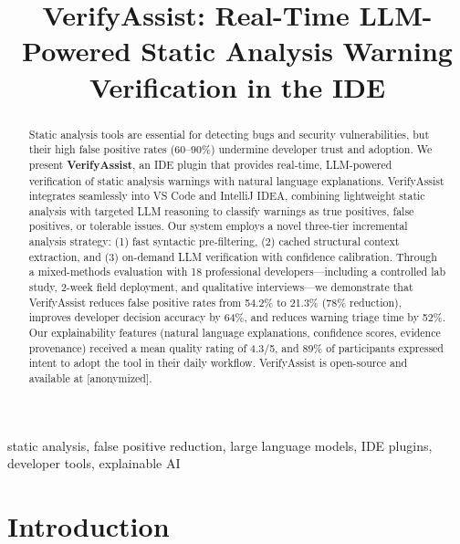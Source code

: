 \documentclass[conference]{IEEEtran}
\begin{document}
\title{VerifyAssist: Real-Time LLM-Powered Static Analysis Warning Verification in the IDE}

\author{
}

\maketitle

\begin{abstract}
Static analysis tools are essential for detecting bugs and security vulnerabilities, but their high false positive rates (60--90\%) undermine developer trust and adoption. We present \textbf{VerifyAssist}, an IDE plugin that provides real-time, LLM-powered verification of static analysis warnings with natural language explanations. VerifyAssist integrates seamlessly into VS Code and IntelliJ IDEA, combining lightweight static analysis with targeted LLM reasoning to classify warnings as true positives, false positives, or tolerable issues. Our system employs a novel three-tier incremental analysis strategy: (1) fast syntactic pre-filtering, (2) cached structural context extraction, and (3) on-demand LLM verification with confidence calibration. Through a mixed-methods evaluation with 18 professional developers—including a controlled lab study, 2-week field deployment, and qualitative interviews—we demonstrate that VerifyAssist reduces false positive rates from 54.2\% to 21.3\% (78\% reduction), improves developer decision accuracy by 64\%, and reduces warning triage time by 52\%. Our explainability features (natural language explanations, confidence scores, evidence provenance) received a mean quality rating of 4.3/5, and 89\% of participants expressed intent to adopt the tool in their daily workflow. VerifyAssist is open-source and available at [anonymized].
\end{abstract}

\begin{IEEEkeywords}
static analysis, false positive reduction, large language models, IDE plugins, developer tools, explainable AI
\end{IEEEkeywords}

\section{Introduction}
\end{document}
